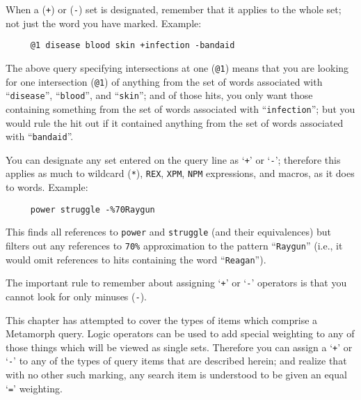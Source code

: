 When a (\verb`+`) or (\verb`-`) set is designated, remember that it
applies to the whole set; not just the word you have marked.  Example:

\begin{verbatim}
     @1 disease blood skin +infection -bandaid
\end{verbatim}

The above query specifying intersections at one (\verb`@1`) means that
you are looking for one intersection (\verb`@1`) of anything from the
set of words associated with ``\verb`disease`'', ``\verb`blood`'', and
``\verb`skin`''; and of those hits, you only want those containing
something from the set of words associated with ``\verb`infection`'';
but you would rule the hit out if it contained anything from the set
of words associated with ``\verb`bandaid`''.

You can designate any set entered on the query line as `\verb`+`' or
`\verb`-`'; therefore this applies as much to wildcard (\verb`*`),
\verb`REX`, \verb`XPM`, \verb`NPM` expressions, and macros, as it does
to words.  Example:

\begin{verbatim}
     power struggle -%70Raygun
\end{verbatim}

This finds all references to \verb`power` and \verb`struggle` (and
their equivalences) but filters out any references to \verb`70%`
approximation to the pattern ``\verb`Raygun`'' (i.e., it would omit
references to hits containing the word ``\verb`Reagan`'').

The important rule to remember about assigning `\verb`+`' or
`\verb`-`' operators is that you cannot look for only minuses
(\verb`-`).

This chapter has attempted to cover the types of items which comprise
a Metamorph query.  Logic operators can be used to add special
weighting to any of those things which will be viewed as single sets.
Therefore you can assign a `\verb`+`' or `\verb`-`' to any of the
types of query items that are described herein; and realize that with
no other such marking, any search item is understood to be given an
equal `\verb`=`' weighting.

